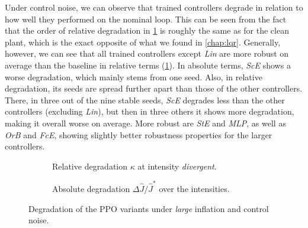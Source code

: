 
Under control noise, we can observe that trained controllers degrade in relation to how well they performed on the nominal
loop. This can be seen from the fact that the order of relative degradation in \cref{fig:rl-noise-large-control-divergent} is roughly the same as for the clean plant, which
is the exact opposite of what we found in \cref{chap:lqr}.
Generally, however, we can see that all trained controllers except \emph{Lin} are more robust on average than the baseline in relative terms (\cref{fig:rl-noise-large-control-divergent}).
In absolute terms, \emph{ScE} shows a worse degradation, which mainly stems from one seed. Also, in relative degradation, its seeds are
spread further apart than those of the other controllers. There, in three out of the nine stable seeds,
\emph{ScE} degrades less than the other controllers (excluding \emph{Lin}), but then
in three others it shows more degradation, making it overall worse on average. More robust are
\emph{StE} and \emph{MLP}, as well as \emph{OrB} and \emph{FcE}, showing slightly better
robustness properties for the larger controllers.

\begin{figure}[htbp]
  \centering
  \begin{subfigure}[t]{0.49\linewidth}
    \centering
    \caption{Relative degradation $\kappa$ at intensity \emph{divergent}.}
    \label{fig:rl-noise-large-control-divergent}
  \end{subfigure}\hfill
  \begin{subfigure}[t]{0.49\linewidth}
    \centering
    \caption{Absolute degradation $\Delta \hat{J} / \hat{J}^{*}$ over the intensities.}
    \label{fig:rl-noise-large-control-absolute}
  \end{subfigure}
  \caption{Degradation of the PPO variants under \emph{large} inflation and control noise.}
  \label{fig:rl-noise-large-control}
\end{figure}


